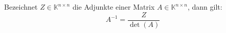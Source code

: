 Bezeichnet $Z \in \mathbb{K}^{n \times n}$ die Adjunkte einer Matrix $A \in \mathbb{K}^{n \times n}$, dann gilt:
$$A^{-1} = \frac{Z}{\det(A)}$$ 
